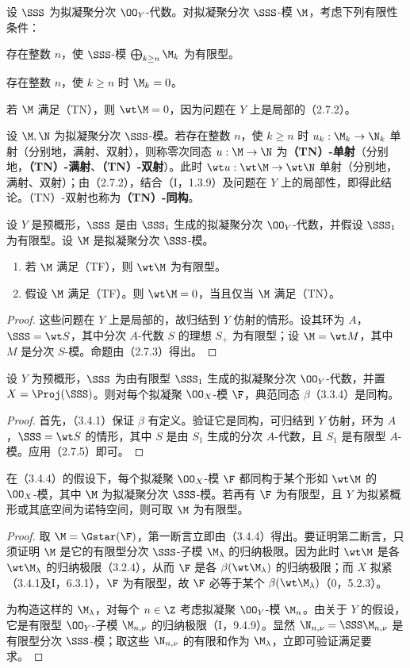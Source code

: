 设 $\SSS$ 为拟凝聚分次 $\OO_Y$-代数。对拟凝聚分次 $\SSS$-模 $\M$，考虑下列有限性条件：
\begin{description}[leftmargin=3.8em,style=nextline]
\item[（TF）] 存在整数 $n$，使 $\SSS$-模 $\bigoplus_{k\geq n}\M_k$ 为有限型。
\item[（TN）] 存在整数 $n$，使 $k\geq n$ 时 $\M_k=0$。
\end{description}
若 $\M$ 满足（TN），则 $\wt\M=0$，因为问题在 $Y$ 上是局部的（2.7.2）。

设 $\M,\N$ 为拟凝聚分次 $\SSS$-模。若存在整数 $n$，使 $k\geq n$ 时 $u_k:\M_k\to\N_k$ 单射（分别地，满射、双射），则称零次同态 $u:\M\to\N$ 为\textbf{（TN）-单射}（分别地，\textbf{（TN）-满射}、\textbf{（TN）-双射}）。此时 $\wt u:\wt\M\to\wt\N$ 单射（分别地，满射、双射）；由（2.7.2），结合（I，1.3.9）及问题在 $Y$ 上的局部性，即得此结论。（TN）-双射也称为\textbf{（TN）-同构}。

设 $Y$ 是预概形，$\SSS$ 是由 $\SSS_1$ 生成的拟凝聚分次 $\OO_Y$-代数，并假设 $\SSS_1$ 为有限型。设 $\M$ 是拟凝聚分次 $\SSS$-模。
\begin{enumerate}[label=(\roman*)]
\item 若 $\M$ 满足（TF），则 $\wt\M$ 为有限型。
\item 假设 $\M$ 满足（TF）。则 $\wt\M=0$，当且仅当 $\M$ 满足（TN）。
\end{enumerate}
\begin{proof}
这些问题在 $Y$ 上是局部的，故归结到 $Y$ 仿射的情形。设其环为 $A$，$\SSS=\wt S$，其中分次 $A$-代数 $S$ 的理想 $S_+$ 为有限型；设 $\M=\wt M$，其中 $M$ 是分次 $S$-模。命题由（2.7.3）得出。
\end{proof}

设 $Y$ 为预概形，$\SSS$ 为由有限型 $\SSS_1$ 生成的拟凝聚分次 $\OO_Y$-代数，并置 $X=\Proj(\SSS)$。则对每个拟凝聚 $\OO_X$-模 $\F$，典范同态 $\beta$（3.3.4）是同构。
\begin{proof}
首先，（3.4.1）保证 $\beta$ 有定义。验证它是同构，可归结到 $Y$ 仿射，环为 $A$，$\SSS=\wt S$ 的情形，其中 $S$ 是由 $S_1$ 生成的分次 $A$-代数，且 $S_1$ 是有限型 $A$-模。应用（2.7.5）即可。
\end{proof}

在（3.4.4）的假设下，每个拟凝聚 $\OO_X$-模 $\F$ 都同构于某个形如 $\wt\M$ 的 $\OO_X$-模，其中 $\M$ 为拟凝聚分次 $\SSS$-模。若再有 $\F$ 为有限型，且 $Y$ 为拟紧概形或其底空间为诺特空间，则可取 $\M$ 为有限型。
\begin{proof}
取 $\M=\Gstar(\F)$，第一断言立即由（3.4.4）得出。要证明第二断言，只须证明 $\M$ 是它的有限型分次 $\SSS$-子模 $\M_\lambda$ 的归纳极限。因为此时 $\wt\M$ 是各 $\wt\M_\lambda$ 的归纳极限（3.2.4），从而 $\F$ 是各 $\beta(\wt\M_\lambda)$ 的归纳极限；而 $X$ 拟紧（3.4.1及I，6.3.1），$\F$ 为有限型，故 $\F$ 必等于某个 $\beta(\wt\M_\lambda)$（0，5.2.3）。

为构造这样的 $\M_\lambda$，对每个 $n\in\Z$ 考虑拟凝聚 $\OO_Y$-模 $\M_n$。由关于 $Y$ 的假设，它是有限型 $\OO_Y$-子模 $\M_{n,\nu}$ 的归纳极限（I，9.4.9）。显然 $\N_{n,\nu}=\SSS\M_{n,\nu}$ 是有限型分次 $\SSS$-模；取这些 $\N_{n,\nu}$ 的有限和作为 $\M_\lambda$，立即可验证满足要求。
\end{proof}

